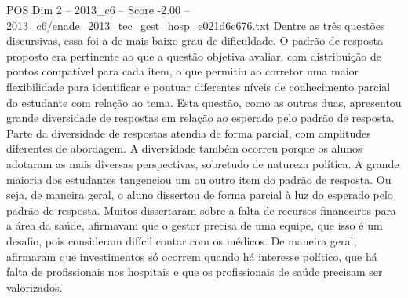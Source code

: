 \begin{textsample}{POS Dim 2 – 2013\_c6 – Score -2.00 – 2013\_c6/enade\_2013\_tec\_gest\_hosp\_e021d6e676.txt}
Dentre as três questões discursivas, essa foi a de mais baixo grau de dificuldade.
O padrão de resposta proposto era pertinente ao que a questão objetiva avaliar, com distribuição de pontos compatível para cada item, o que permitiu ao corretor uma maior flexibilidade para identificar e pontuar diferentes níveis de conhecimento parcial do estudante com relação ao tema.
Esta questão, como as outras duas, apresentou grande diversidade de respostas em relação ao esperado pelo padrão de resposta.
Parte da diversidade de respostas atendia de forma parcial, com amplitudes diferentes de abordagem.
A diversidade também ocorreu porque os alunos adotaram as mais diversas perspectivas, sobretudo de natureza política.
A grande maioria dos estudantes tangenciou um ou outro item do padrão de resposta.
Ou seja, de maneira geral, o aluno dissertou de forma parcial à luz do esperado pelo padrão de resposta.
Muitos dissertaram sobre a falta de recursos financeiros para a área da saúde, afirmavam que o gestor precisa de uma equipe, que isso é um desafio, pois consideram difícil contar com os médicos.
De maneira geral, afirmaram que investimentos só ocorrem quando há interesse político, que há falta de profissionais nos hospitais e que os profissionais de saúde precisam ser valorizados.

\end{textsample}
